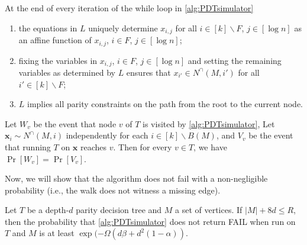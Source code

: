 \documentclass[10pt,a4paper]{article}
\theoremstyle{definition}
\theoremstyle{remark}
\theoremstyle{example}
\theoremstyle{plain}
\renewcommand{\setminus}{\smallsetminus}
\newcommand{\CNbound}{R}
\newcommand{\edgeProbResLin}{\alpha}
\begin{document}
\begin{lemma}
    \label{lemma:simulation-properties}
    At the end of every iteration of the while loop in \autoref{alg:PDTsimulator}
    \begin{enumerate}
        \item the equations in $L$ uniquely determine $x_{i,j}$ for all $i\in[k]\setminus F$, $j\in [{\log n}]$ as an affine function of $x_{i,j}$, $i\in F$, $j\in [{\log n}]$;
        \item fixing the variables in $x_{i,j}$, $i\in F$, $j\in [{\log n}]$ and setting the remaining variables as determined by $L$ ensures that $x_{i'}\in N^\cap(M,i')$ for all ${i'}\in [k]\setminus F$;
        \item $L$ implies all parity constraints on the path from the root to the current node.
    \end{enumerate}
\end{lemma}

\begin{lemma}
\label{lemma:PDTwalkRelation}
Let $W_v$ be the event that node $v$ of $T$ is visited by \autoref{alg:PDTsimulator}, Let $\bm x_i \sim N^\cap(M,i)$ independently for each $i \in [k] \setminus B(M)$, and $V_v$ be the event that running $T$ on $\bm x$ reaches $v$. Then for every $v \in T$, we have $\Pr[W_v] = \Pr[V_v]$. 
\end{lemma}

Now, we will show that the algorithm does not fail with a non-negligible probability (i.e., the walk does not witness a missing edge).

\begin{lemma}
    \label{lemma:pdtSuccessProb}
    Let $T$ be a depth-$d$ parity decision tree and $M$ a set of vertices. If $|M|+8d\leq \CNbound$, then the probability that \autoref{alg:PDTsimulator} does not return FAIL when run on $T$ and  $M$ is at least $\exp(-\Omega(d\beta+d^2(1-\edgeProbResLin))$.
\end{lemma}
\end{document}
